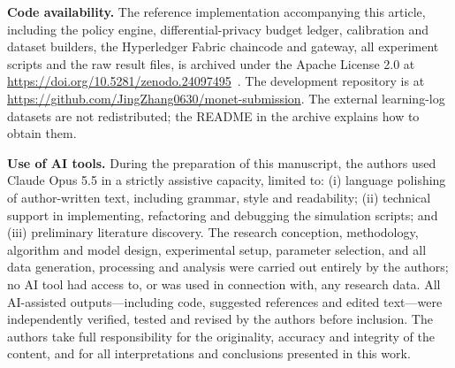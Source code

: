 \documentclass[pdflatex,iicol,sn-mathphys-num]{sn-jnl}
\theoremstyle{thmstyleone}
\begin{document}
\textbf{Code availability.} The reference implementation accompanying this article, including the policy engine, differential-privacy budget ledger, calibration and dataset builders, the Hyperledger Fabric chaincode and gateway, all experiment scripts and the raw result files, is archived under the Apache License 2.0 at \url{https://doi.org/10.5281/zenodo.24097495}~\cite{zhang2026learnflowchain}. The development repository is at \url{https://github.com/JingZhang0630/monet-submission}. The external learning-log datasets are not redistributed; the README in the archive explains how to obtain them.

\textbf{Use of AI tools.} During the preparation of this manuscript, the authors used
Claude Opus 5.5 in a strictly assistive capacity, limited to:
(i) language polishing of author-written text, including grammar, style and readability;
(ii) technical support in implementing, refactoring and debugging the simulation scripts;
and (iii) preliminary literature discovery. The research conception, methodology, algorithm
and model design, experimental setup, parameter selection, and all data generation, processing
and analysis were carried out entirely by the authors; no AI tool had access to, or was used
in connection with, any research data. All AI-assisted outputs---including code, suggested
references and edited text---were independently verified, tested and revised by the authors
before inclusion. The authors take full responsibility for the originality, accuracy and
integrity of the content, and for all interpretations and conclusions presented in this work.


\end{document}
